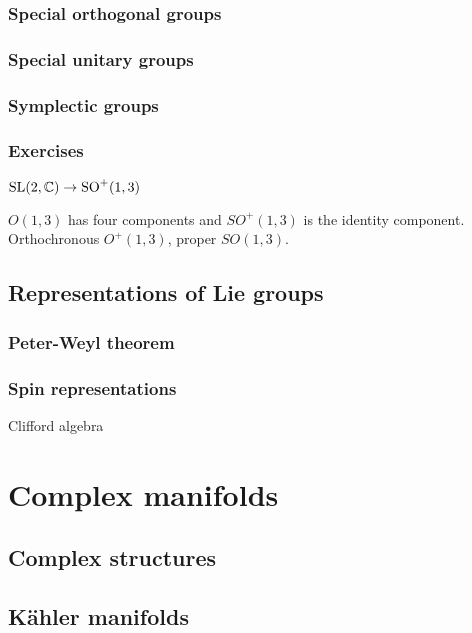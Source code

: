 \documentclass{../../large}
\begin{document}
\section{Special orthogonal groups}
\section{Special unitary groups}
\section{Symplectic groups}

\section*{Exercises}
\begin{prb}
$\mathrm{SL}(2,\mathbb{C})\to\mathrm{SO}^+(1,3)$
\begin{parts}
\item $O(1,3)$ has four components and $SO^+(1,3)$ is the identity component. Orthochronous $O^+(1,3)$, proper $SO(1,3)$.
\end{parts}
\end{prb}





\chapter{Representations of Lie groups}
\section{Peter-Weyl theorem}
\section{Spin representations}
Clifford algebra




\part{Complex manifolds}

\chapter{Complex structures}

\chapter{K\"ahler manifolds}

\chapter{}
\end{document}

